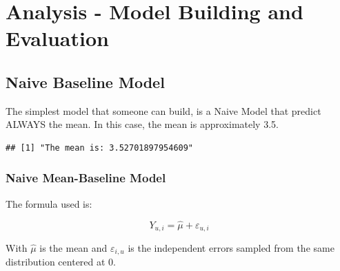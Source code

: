 \documentclass[
]{article}
\newenvironment{Shaded}{}{}
\newcommand{\AttributeTok}[1]{\textcolor[rgb]{0.49,0.56,0.16}{#1}}
\newcommand{\CommentTok}[1]{\textcolor[rgb]{0.38,0.63,0.69}{\textit{#1}}}
\newcommand{\FunctionTok}[1]{\textcolor[rgb]{0.02,0.16,0.49}{#1}}
\newcommand{\NormalTok}[1]{#1}
\newcommand{\OtherTok}[1]{\textcolor[rgb]{0.00,0.44,0.13}{#1}}
\newcommand{\SpecialCharTok}[1]{\textcolor[rgb]{0.25,0.44,0.63}{#1}}
\newcommand{\StringTok}[1]{\textcolor[rgb]{0.25,0.44,0.63}{#1}}
\begin{document}
\hypertarget{analysis---model-building-and-evaluation}{%
\section{Analysis - Model Building and
Evaluation}\label{analysis---model-building-and-evaluation}}

\hypertarget{naive-baseline-model}{%
\subsection{Naive Baseline Model}\label{naive-baseline-model}}

The simplest model that someone can build, is a Naive Model that predict
ALWAYS the mean. In this case, the mean is approximately 3.5.

\begin{Shaded}
\end{Shaded}

\begin{verbatim}
## [1] "The mean is: 3.52701897954609"
\end{verbatim}

\hypertarget{naive-mean-baseline-model}{%
\subsubsection{Naive Mean-Baseline
Model}\label{naive-mean-baseline-model}}

The formula used is:

\[Y_{u,i} = \hat{\mu} + \varepsilon_{u,i}\]

With \(\hat{\mu}\) is the mean and \(\varepsilon_{i,u}\) is the
independent errors sampled from the same distribution centered at 0.

\begin{Shaded}
\end{Shaded}
\end{document}
